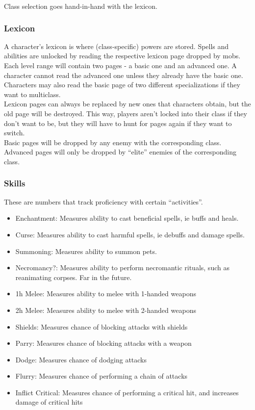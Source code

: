 \documentclass{article}
\begin{document}
Class selection goes hand-in-hand with the lexicon.

\subsubsection{Lexicon}
A character's lexicon is where (class-specific) powers are stored.
Spells and abilities are unlocked by reading the respective lexicon page dropped by mobs. Each level
range will contain two pages - a basic one and an advanced one. A character cannot read the advanced
one unless they already have the basic one. Characters may also read the basic page of two different
specializations if they want to multiclass.\\
Lexicon pages can always be replaced by new ones that characters obtain, but the old page will
be destroyed. This way, players aren't locked into their class if they don't want to be, but they
will have to hunt for pages again if they want to switch.\\
Basic pages will be dropped by any enemy with the corresponding class.\\
Advanced pages will only be dropped by ``elite'' enemies of the corresponding class.

\subsubsection{Skills}
These are numbers that track proficiency with certain ``activities''.
\begin{itemize}
    \item Enchantment: Measures ability to cast beneficial spells, ie buffs and heals.
    \item Curse: Measures ability to cast harmful spells, ie debuffs and damage spells.
    \item Summoning: Measures ability to summon pets.
    \item Necromancy?: Measures ability to perform necromantic rituals, such as reanimating corpses.
        Far in the future.
    \item 1h Melee: Measures ability to melee with 1-handed weapons
    \item 2h Melee: Measures ability to melee with 2-handed weapons
    \item Shields: Measures chance of blocking attacks with shields
    \item Parry: Measures chance of blocking attacks with a weapon
    \item Dodge: Measures chance of dodging attacks
    \item Flurry: Measures chance of performing a chain of attacks
    \item Inflict Critical: Measures chance of performing a critical hit, and increases damage of critical hits
\end{itemize}
\end{document}
